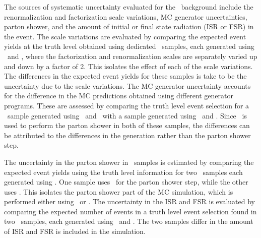 The sources of systematic uncertainty evaluated for the \TTBAR\ background
include the renormalization and factorization scale variations, MC generator
uncertainties, parton shower, and the amount of initial or final state
radiation (ISR or FSR) in the event.
The scale variations are evaluated by comparing the expected event yields at the
truth level obtained using dedicated \TTBAR\ samples, each generated using
\powheg\ and \pythia, where the factorization and renormalization
scales are separately varied up and down by a factor of 2.
This isolates the effect of each of the scale variations.
The differences in the expected event yields for these samples is take to be
the uncertainty due to the scale variations.
The MC generator uncertainty accounts for the difference in the MC predictions
obtained using different generator programs.
These are assessed by comparing the truth level event selection for a
\TTBAR\ sample generated using \powheg\ and \jimmy\ with a sample
generated using \mcnlo\ and \jimmy.
Since \jimmy\ is used to perform the parton shower in both of these
samples, the differences can be attributed to the differences in the
generation rather than the parton shower step.

The uncertainty in the parton shower in \TTBAR\ samples is estimated by
comparing the expected event yields using the truth level information for two
\TTBAR\ samples each generated using \powheg.
One sample uses \pythia\ for the parton shower step, while the other
uses \jimmy.
This isolates the parton shower part of the MC simulation, which is performed
either using \pythia\ or \jimmy.
The uncertainty in the ISR and FSR is evaluated by comparing the expected number
of events in a truth level event selection found in two \TTBAR\ samples, each
generated using \acermc\ and \pythia.
The two samples differ in the amount of ISR and FSR is included in the
simulation.

